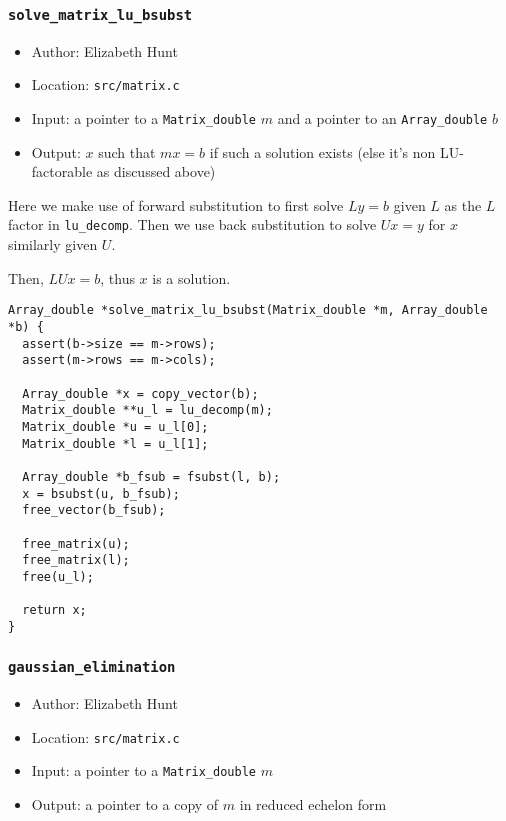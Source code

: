 \documentclass[11pt]{article}
\begin{document}
\subsubsection{\texttt{solve\_matrix\_lu\_bsubst}}
\label{sec:orgbf1dbcb}
\begin{itemize}
\item Author: Elizabeth Hunt
\item Location: \texttt{src/matrix.c}
\item Input: a pointer to a \texttt{Matrix\_double} \(m\) and a pointer to an \texttt{Array\_double} \(b\)
\item Output: \(x\) such that \(mx = b\) if such a solution exists (else it's non LU-factorable as discussed
above)
\end{itemize}

Here we make use of forward substitution to first solve \(Ly = b\) given \(L\) as the \(L\) factor in
\texttt{lu\_decomp}. Then we use back substitution to solve \(Ux = y\) for \(x\) similarly given \(U\).

Then, \(LUx = b\), thus \(x\) is a solution.

\begin{verbatim}
Array_double *solve_matrix_lu_bsubst(Matrix_double *m, Array_double *b) {
  assert(b->size == m->rows);
  assert(m->rows == m->cols);

  Array_double *x = copy_vector(b);
  Matrix_double **u_l = lu_decomp(m);
  Matrix_double *u = u_l[0];
  Matrix_double *l = u_l[1];

  Array_double *b_fsub = fsubst(l, b);
  x = bsubst(u, b_fsub);
  free_vector(b_fsub);

  free_matrix(u);
  free_matrix(l);
  free(u_l);

  return x;
}
\end{verbatim}

\subsubsection{\texttt{gaussian\_elimination}}
\label{sec:orgc3ceb7b}
\begin{itemize}
\item Author: Elizabeth Hunt
\item Location: \texttt{src/matrix.c}
\item Input: a pointer to a \texttt{Matrix\_double} \(m\)
\item Output: a pointer to a copy of \(m\) in reduced echelon form
\end{itemize}
\end{document}
